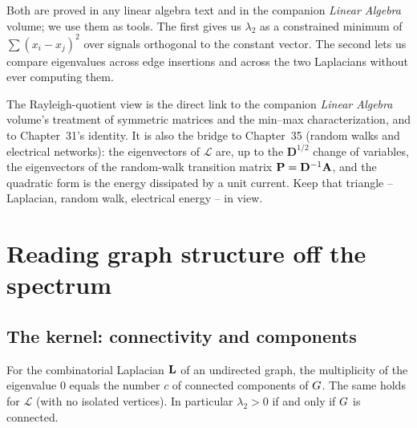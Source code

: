 Both are proved in any linear algebra text and in the companion \emph{Linear Algebra} volume; we use them as tools. The first gives us $\lambda_2$ as a constrained minimum of $\sum (x_i-x_j)^2$ over signals orthogonal to the constant vector. The second lets us compare eigenvalues across edge insertions and across the two Laplacians without ever computing them.

\begin{connectionbox}
The Rayleigh-quotient view is the direct link to the companion \emph{Linear Algebra} volume's treatment of symmetric matrices and the min--max characterization, and to Chapter~31's identity. It is also the bridge to Chapter~35 (random walks and electrical networks): the eigenvectors of $\mathcal{L}$ are, up to the $\mathbf{D}^{1/2}$ change of variables, the eigenvectors of the random-walk transition matrix $\mathbf{P}=\mathbf{D}^{-1}\mathbf{A}$, and the quadratic form is the energy dissipated by a unit current. Keep that triangle -- Laplacian, random walk, electrical energy -- in view.
\end{connectionbox}

\section{Reading graph structure off the spectrum}
\label{ch32:structure}

\subsection{The kernel: connectivity and components}

\begin{theorem}
\label{ch32:components}
For the combinatorial Laplacian $\mathbf{L}$ of an undirected graph, the multiplicity of the eigenvalue $0$ equals the number $c$ of connected components of $G$. The same holds for $\mathcal{L}$ (with no isolated vertices). In particular $\lambda_2>0$ if and only if $G$ is connected.
\end{theorem}

